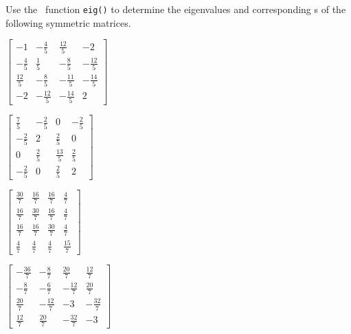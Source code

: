 \begin{exercise}  
Use the \script\ function \verb|eig()| to determine the eigenvalues and corresponding s of the following symmetric matrices.
\begin{Parts}
\item  \(\begin{bmatrix} -1 & -\frac{4}{5} & \frac{12}{5} & -2
\\ -\frac{4}{5} & \frac{1}{5} & -\frac{8}{5} & -\frac{12}{5}
\\ \frac{12}{5} & -\frac{8}{5} & -\frac{11}{5} & -\frac{14}{5}
\\ -2 & -\frac{12}{5} & -\frac{14}{5} & 2
\end{bmatrix}\)

\item  \(\begin{bmatrix} \frac{7}{5} & -\frac{2}{5} & 0 & -\frac{2}{5}
\\ -\frac{2}{5} & 2 & \frac{2}{5} & 0
\\ 0 & \frac{2}{5} & \frac{13}{5} & \frac{2}{5}
\\ -\frac{2}{5} & 0 & \frac{2}{5} & 2
\end{bmatrix}\)

\begin{OmitV1}
\item  \(\begin{bmatrix} \frac{30}{7} & \frac{16}{7} & \frac{16}{7} & \frac{4}{7}
\\ \frac{16}{7} & \frac{30}{7} & \frac{16}{7} & \frac{4}{7}
\\ \frac{16}{7} & \frac{16}{7} & \frac{30}{7} & \frac{4}{7}
\\ \frac{4}{7} & \frac{4}{7} & \frac{4}{7} & \frac{15}{7}
\end{bmatrix}\)

\item  \(\begin{bmatrix} -\frac{36}{7} & -\frac{8}{7} & \frac{20}{7} & \frac{12}{7}
\\ -\frac{8}{7} & -\frac{6}{7} & -\frac{12}{7} & \frac{20}{7}
\\ \frac{20}{7} & -\frac{12}{7} & -3 & -\frac{32}{7}
\\ \frac{12}{7} & \frac{20}{7} & -\frac{32}{7} & -3
\end{bmatrix}\)


\end{OmitV1}
\end{Parts}
\end{exercise}
